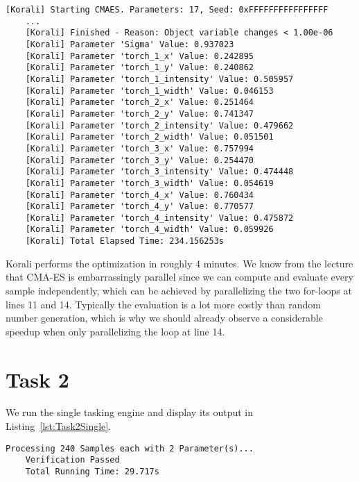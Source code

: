\documentclass[11pt]{article}
\begin{document}
    \begin{lstlisting}[basicstyle=\tiny, frame=single, caption={Korali
    output when maximizing the likelihood of the heat distribution given the
    model with four candles.}, label={lst:Task1}]
    [Korali] Starting CMAES. Parameters: 17, Seed: 0xFFFFFFFFFFFFFFFF
    ...
    [Korali] Finished - Reason: Object variable changes < 1.00e-06
    [Korali] Parameter 'Sigma' Value: 0.937023
    [Korali] Parameter 'torch_1_x' Value: 0.242895
    [Korali] Parameter 'torch_1_y' Value: 0.240862
    [Korali] Parameter 'torch_1_intensity' Value: 0.505957
    [Korali] Parameter 'torch_1_width' Value: 0.046153
    [Korali] Parameter 'torch_2_x' Value: 0.251464
    [Korali] Parameter 'torch_2_y' Value: 0.741347
    [Korali] Parameter 'torch_2_intensity' Value: 0.479662
    [Korali] Parameter 'torch_2_width' Value: 0.051501
    [Korali] Parameter 'torch_3_x' Value: 0.757994
    [Korali] Parameter 'torch_3_y' Value: 0.254470
    [Korali] Parameter 'torch_3_intensity' Value: 0.474448
    [Korali] Parameter 'torch_3_width' Value: 0.054619
    [Korali] Parameter 'torch_4_x' Value: 0.760434
    [Korali] Parameter 'torch_4_y' Value: 0.770577
    [Korali] Parameter 'torch_4_intensity' Value: 0.475872
    [Korali] Parameter 'torch_4_width' Value: 0.059926
    [Korali] Total Elapsed Time: 234.156253s
    \end{lstlisting}

    Korali performs the optimization in roughly 4 minutes.
    We know from the lecture that CMA-ES is embarrassingly parallel since we
    can compute and evaluate every sample independently, which can be
    achieved by parallelizing the two for-loops at lines 11 and 14.
    Typically the evaluation is a lot more costly than random
    number generation, which is why we should already observe a considerable
    speedup when only parallelizing the loop at line 14.

    \section*{Task 2}
    \label{sec:Task2}

    We run the single tasking engine and display its output in
    Listing~\ref{lst:Task2Single}.

    \begin{lstlisting}[basicstyle=\tiny, frame=single, caption={Output from
    executing the single tasking engine.}, label={lst:Task2Single}]
    Processing 240 Samples each with 2 Parameter(s)...
    Verification Passed
    Total Running Time: 29.717s
    \end{lstlisting}
\end{document}
